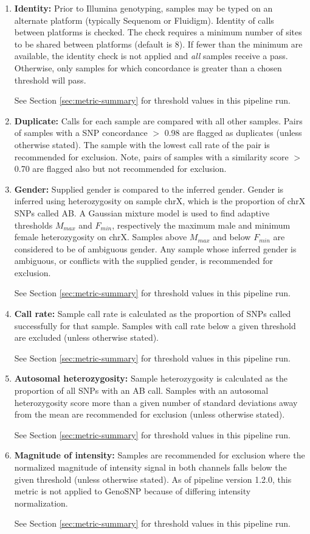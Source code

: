\begin{enumerate}
\item \textbf{Identity:} Prior to Illumina genotyping, samples may be typed on an alternate platform (typically Sequenom or Fluidigm). Identity of calls between platforms is checked.  The check requires a minimum number of sites to be shared between platforms (default is 8). If fewer than the minimum are available, the identity check is not applied and \emph{all} samples receive a pass. Otherwise, only samples for which concordance is greater than a chosen threshold will pass.

See Section \ref{sec:metric-summary} for threshold values in this pipeline run.

\item \textbf{Duplicate:}  Calls for each sample are compared with all other samples.  Pairs of samples with a SNP concordance $>$ 0.98 are flagged as duplicates (unless otherwise stated).  The sample with the lowest call rate of the pair is recommended for exclusion.  Note, pairs of samples with a similarity score $>$ 0.70 are flagged also but not recommended for exclusion.

\item \textbf{Gender:} Supplied gender is compared to the inferred gender. Gender is inferred using heterozygosity on sample chrX, which is the proportion of chrX SNPs called AB. A Gaussian mixture model is used to find adaptive thresholds $M_{max}$ and $F_{min}$, respectively the maximum male and minimum female heterozygosity on chrX.  Samples above $M_{max}$ and below $F_{min}$ are considered to be of ambiguous gender.  Any sample whose inferred gender is ambiguous, or conflicts with the supplied gender, is recommended for exclusion.

See Section \ref{sec:metric-summary} for threshold values in this pipeline run.

\item \textbf{Call rate:} Sample call rate is calculated as the proportion of SNPs called successfully for that sample.  Samples with call rate below a given threshold are excluded (unless otherwise stated). 

See Section \ref{sec:metric-summary} for threshold values in this pipeline run.

\item \textbf{Autosomal heterozygosity:}  Sample heterozygosity is calculated as the proportion of all SNPs with an AB call.  Samples with an autosomal heterozygosity score more than a given number of standard deviations away from the mean are recommended for exclusion (unless otherwise stated).  

See Section \ref{sec:metric-summary} for threshold values in this pipeline run.

\item \textbf{Magnitude of intensity:} Samples are recommended for exclusion where the normalized magnitude of intensity signal in both channels falls below the given threshold (unless otherwise stated). As of pipeline version 1.2.0, this metric is not applied to GenoSNP because of differing intensity normalization.

See Section \ref{sec:metric-summary} for threshold values in this pipeline run.
\end{enumerate}
